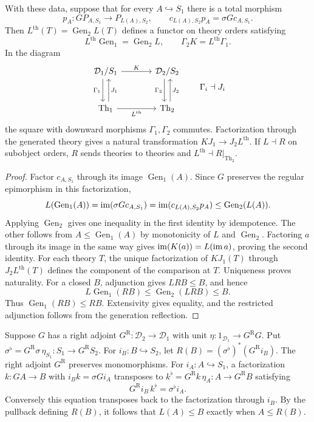 \begin{proposition}\label{prop:deduction-comparison}
With these data, suppose that for every $A\hookrightarrow S_1$
there is a total morphism
\[
 p_A:GP_{A,S_1}\to P_{L(A),S_2},\qquad
 c_{L(A),S_2}p_A=\sigma Gc_{A,S_1}.
\]
Then $L^{\mathrm{th}}(T)=\operatorname{Gen}_2L(T)$ defines a
functor on theory orders satisfying
\[
 L^{\mathrm{th}}\operatorname{Gen}_1=\operatorname{Gen}_2L,
 \qquad \Gamma_2K=L^{\mathrm{th}}\Gamma_1.
\]
In the diagram
\[
\begin{tikzcd}[column sep=large,row sep=large]
 \mathcal D_1/S_1\arrow[r,"K"]
   \arrow[d,shift right=.8ex,"\Gamma_1"'] &
 \mathcal D_2/S_2\arrow[d,shift right=.8ex,"\Gamma_2"']\\
 \operatorname{Th}_1\arrow[r,"L^{\mathrm{th}}"']
   \arrow[u,shift right=.8ex,"J_1"'] &
 \operatorname{Th}_2\arrow[u,shift right=.8ex,"J_2"']
\end{tikzcd}
\qquad \Gamma_i\dashv J_i
\]
the square with downward morphisms $\Gamma_1,\Gamma_2$ commutes.
Factorization through the generated theory gives a natural
transformation $KJ_1\to J_2L^{\mathrm{th}}$.
If $L\dashv R$ on subobject orders, $R$ sends theories to theories
and $L^{\mathrm{th}}\dashv R|_{\operatorname{Th}_2}$.
\end{proposition}
\begin{proof}
Factor $c_{A,S_1}$ through its image $\operatorname{Gen}_1(A)$.
Since $G$ preserves the regular epimorphism in this factorization,
\[
 L(\operatorname{Gen}_1(A))
 =\operatorname{im}(\sigma Gc_{A,S_1})
 =\operatorname{im}(c_{L(A),S_2}p_A)
 \leq\operatorname{Gen}_2(L(A)).
\]
Applying $\operatorname{Gen}_2$ gives one inequality in the first
identity by idempotence. The other follows from
$A\leq\operatorname{Gen}_1(A)$ by monotonicity of $L$ and
$\operatorname{Gen}_2$. Factoring $a$ through its image in the same
way gives $\operatorname{im}(K(a))=L(\operatorname{im} a)$, proving the second identity.
For each theory $T$, the unique factorization of $KJ_1(T)$ through
$J_2L^{\mathrm{th}}(T)$ defines the component of the comparison at $T$. Uniqueness proves naturality.
For a closed $B$, adjunction gives $LRB\leq B$, and hence
\[
 L\operatorname{Gen}_1(RB)
 \leq\operatorname{Gen}_2(LRB)\leq B.
\]
Thus $\operatorname{Gen}_1(RB)\leq RB$. Extensivity gives
equality, and the restricted adjunction follows from the
generation reflection.
\end{proof}

Suppose $G$ has a right adjoint $G^{\mathrm R}:\mathcal D_2\to\mathcal D_1$
with unit $\eta:1_{\mathcal D_1}\to G^{\mathrm R}G$. Put
$\sigma^\flat=G^{\mathrm R}\sigma\,\eta_{S_1}:S_1\to G^{\mathrm R}S_2$.
For $i_B:B\hookrightarrow S_2$, let $R(B)=(\sigma^\flat)^*(G^{\mathrm R} i_B)$.
The right adjoint $G^{\mathrm R}$ preserves monomorphisms.
For $i_A:A\hookrightarrow S_1$, a factorization
$k:GA\to B$ with $i_Bk=\sigma G i_A$ transposes to
$k^\flat=G^{\mathrm R}k\,\eta_A:A\to G^{\mathrm R}B$ satisfying
\[
 G^{\mathrm R} i_B\,k^\flat=\sigma^\flat i_A .
\]
Conversely this equation transposes back to the factorization through
$i_B$. By the pullback defining $R(B)$, it follows that
$L(A)\leq B$ exactly when $A\leq R(B)$.

